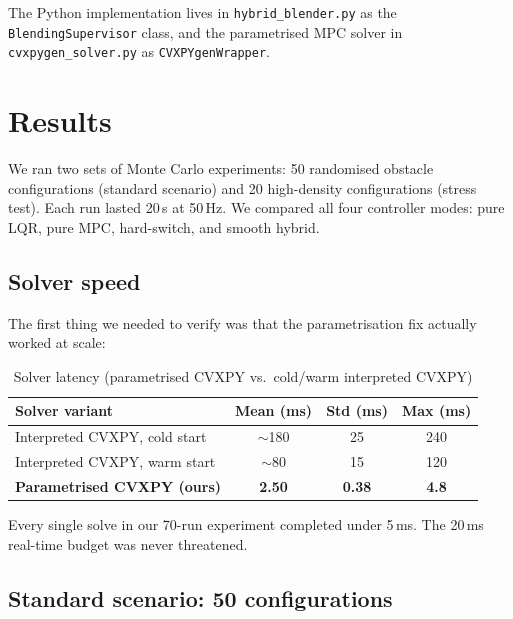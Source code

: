 \documentclass[12pt,a4paper]{article}
\begin{document}
The Python implementation lives in \texttt{hybrid\_blender.py} as the
\texttt{BlendingSupervisor} class, and the parametrised MPC solver in
\texttt{cvxpygen\_solver.py} as \texttt{CVXPYgenWrapper}.

\section{Results}

We ran two sets of Monte Carlo experiments: 50 randomised obstacle
configurations (standard scenario) and 20 high-density configurations
(stress test). Each run lasted 20\,s at 50\,Hz. We compared all four
controller modes: pure LQR, pure MPC, hard-switch, and smooth hybrid.

\subsection{Solver speed}

The first thing we needed to verify was that the parametrisation fix
actually worked at scale:

\begin{table}[H]
\centering
\caption{Solver latency (parametrised CVXPY vs.\ cold/warm interpreted CVXPY)}
\begin{tabular}{lccc}
\toprule
\textbf{Solver variant} & \textbf{Mean (ms)} & \textbf{Std (ms)} & \textbf{Max (ms)} \\
\midrule
Interpreted CVXPY, cold start & $\sim$180 & 25 & 240 \\
Interpreted CVXPY, warm start & $\sim$80  & 15 & 120 \\
\textbf{Parametrised CVXPY (ours)} & \textbf{2.50} & \textbf{0.38} & \textbf{4.8} \\
\bottomrule
\end{tabular}
\end{table}

Every single solve in our 70-run experiment completed under 5\,ms. The
20\,ms real-time budget was never threatened.

\subsection{Standard scenario: 50 configurations}
\end{document}
